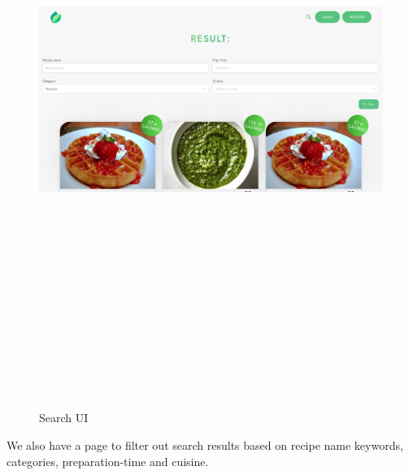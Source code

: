 \begin{figure}[!hb]
\centering
\caption[Search UI]{Search UI}%
\label{fig:search_ui}
\includegraphics[width=\linewidth,height=20cm,keepaspectratio]{img/search_ui}
\end{figure}

We also have a page to filter out search results based on recipe name keywords, categories, preparation-time and cuisine. 



